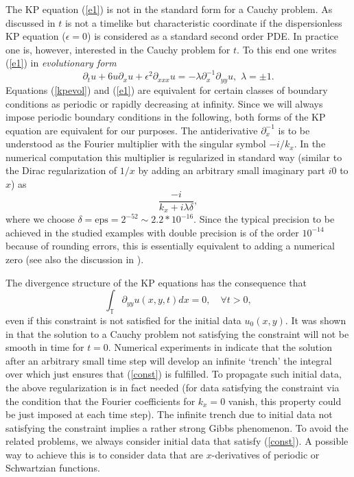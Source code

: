 \documentclass[final]{siamltex}
\begin{document}
The KP equation (\ref{e1}) is not in the standard form 
for a Cauchy problem. As discussed in \cite{KSM} $t$ is not a 
timelike but characteristic coordinate if the dispersionless KP 
equation ($\epsilon=0$) is considered as a standard second order PDE. 
In practice one is, however, interested in the Cauchy problem for 
$t$. To this end one writes (\ref{e1}) in \emph{evolutionary 
form} 
\begin{equation}
   \partial_{t}u+6u\partial_{x}u+\epsilon^{2}\partial_{xxx}u=
   -\lambda\partial_{x}^{-1}
   \partial_{yy}u,\,\,\lambda=\pm1
    \label{kpevol}.
\end{equation}
Equations (\ref{kpevol}) and (\ref{e1}) are equivalent for certain 
classes of boundary conditions as periodic or rapidly decreasing at 
infinity. Since we will always impose periodic boundary conditions in 
the following, both forms of the KP equation are equivalent for our 
purposes.
The antiderivative $\partial_{x}^{-1}$ is to be understood as 
the Fourier multiplier with the singular symbol $-i/k_{x}$. In the 
numerical computation this multiplier is regularized in standard way 
(similar to the Dirac regularization of $1/x$ by adding an arbitrary 
small imaginary part $i0$ to $x$) as 
$$\frac{-i}{k_{x}+i\lambda\delta},$$
where we choose $\delta=\mbox{eps}=2^{-52}\sim 2.2*10^{-16}$. Since 
the typical precision to be achieved in the studied examples with double precision is of the 
order $10^{-14}$ because of rounding errors, this is essentially 
equivalent to adding a numerical zero (see also the discussion in 
\cite{KSM}). 

The divergence structure of the KP equations has the consequence that 
\begin{equation}
    \int_{\mathbb{T}}^{}\partial_{yy}u(x,y,t)dx=0,\quad \forall t>0
    \label{const},
\end{equation}
even if this constraint is not satisfied for the initial data 
$u_{0}(x,y)$. It was shown in \cite{FS,MST} that the solution to a 
Cauchy problem not satisfying the constraint will not be smooth in 
time for $t=0$. Numerical experiments in \cite{KSM} indicate that 
the solution after an arbitrary small time step will develop an 
infinite `trench' the integral over which just ensures that 
(\ref{const}) is fulfilled. To propagate such initial data, the above 
regularization is in fact needed (for data satisfying the constraint 
via the condition that the Fourier coefficients for $k_{x}=0$ vanish, this 
property could be just imposed at each time step). 
The infinite trench due to initial data not satisfying the 
constraint implies a rather strong Gibbs 
phenomenon. To avoid the related problems, we always consider initial 
data that satisfy (\ref{const}). A possible way to achieve this is to 
consider data that are $x$-derivatives of periodic or Schwartzian 
functions. 
\end{document}
